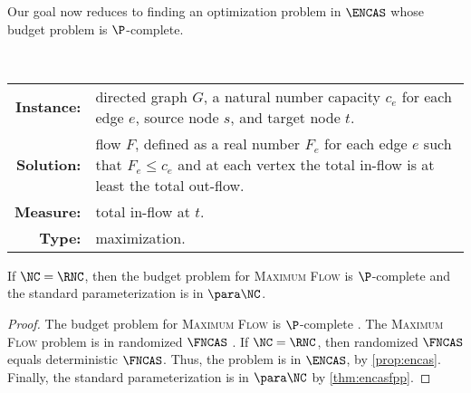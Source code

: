Our goal now reduces to finding an optimization problem in $\ENCAS$ whose budget problem is $\P$-complete.

\begin{definition}
  \mbox{} \\
  \begin{tabular}{r p{9.2cm}}
    \textbf{Instance:} & directed graph $G$, a natural number capacity $c_e$ for each edge $e$, source node $s$, and target node $t$. \\
    \textbf{Solution:} & flow $F$, defined as a real number $F_e$ for each edge $e$ such that $F_e \leq c_e$ and at each vertex the total in-flow is at least the total out-flow. \\
    \textbf{Measure:} & total in-flow at $t$. \\
    \textbf{Type:} & maximization.
  \end{tabular}
\end{definition}


\begin{theorem}
  If $\NC = \RNC$, then the budget problem for \textsc{Maximum Flow} is $\P$-complete and the standard parameterization is in $\para \NC$.
\end{theorem}
\begin{proof}
  The budget problem for \textsc{Maximum Flow} is $\P$-complete \autocite[Problem~A.4.4]{ghr95}.
  The \textsc{Maximum Flow} problem is in randomized $\FNCAS$ \autocite[Theorem~4.5.2]{dsst97}.
  If $\NC = \RNC$, then randomized $\FNCAS$ equals deterministic $\FNCAS$.
  Thus, the problem is in $\ENCAS$, by \autoref{prop:encas}.
  Finally, the standard parameterization is in $\para \NC$ by \autoref{thm:encasfpp}.
\end{proof}


